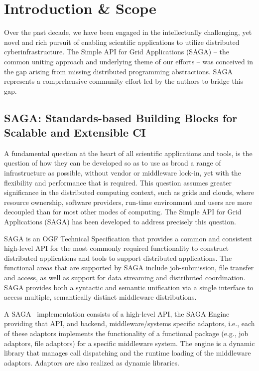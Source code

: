 \documentclass[]{article}
\newcommand{\B}[1]{\textbf{#1}}
\newcommand{\jhanote}[1]{{\textcolor{red}{     \B{Shantenu:} #1 }}}
\newcommand{\jhanote}[1]{}
\begin{document}
\section{Introduction \& Scope }
\label{sec:intro}

 Over the past decade, we have been engaged in the intellectually
 challenging, yet novel and rich pursuit of enabling scientific
 applications to utilize distributed cyberinfrastructure. The Simple API
 for Grid Applications (SAGA) -- the common uniting approach and
 underlying theme of our efforts -- was conceived in the gap arising
 from missing distributed programming abstractions.  SAGA represents
 a comprehensive community effort led by the authors to bridge this gap.


\subsection{SAGA: Standards-based Building Blocks for Scalable and Extensible CI}

A fundamental question at the heart of all scientiﬁc applications and
tools, is the question of how they can be developed so as to use as
broad a range of infrastructure as possible, without vendor or
middleware lock-in, yet with the ﬂexibility and performance that is
required. This question assumes greater signiﬁcance in the distributed
computing context, such as grids and clouds, where resource ownership,
software providers, run-time environment and users are more decoupled
than for most other modes of computing.  The Simple API for Grid
Applications (SAGA) has been developed to address precisely this
question.

SAGA is an OGF Technical Specification that provides a common and
consistent high-level API for the most commonly required functionality
to construct distributed applications and tools to support distributed
applications. The functional areas that are supported by SAGA include
job-submission, file transfer and access, as well as support for data
streaming and distributed coordination.  SAGA provides both a
syntactic and semantic unification via a single interface to access
multiple, semantically distinct middleware distributions.

A SAGA~\cite{saga-url} implementation consists of a high-level API,
the SAGA Engine providing that API, and backend, middleware/systems
specific adaptors, i.e., each of these adaptors implements the
functionality of a functional package (e.g., job adaptors, ﬁle
adaptors) for a speciﬁc middleware system. The engine is a dynamic
library that manages call dispatching and the runtime loading of the
middleware adaptors. Adaptors are also realized as dynamic libraries.
\end{document}
